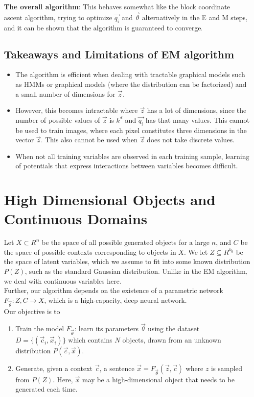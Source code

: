\documentclass[a4paper]{article}
\begin{document}
\textbf{The overall algorithm}: This behaves somewhat like the block coordinate ascent algorithm, trying to optimize $\vec{q_i}$ and $\vec{\theta}$ alternatively in the E and M steps, and it can be shown that the algorithm is guaranteed to converge.

\subsection{Takeaways and Limitations of EM algorithm} \begin{itemize}
    \item The algorithm is efficient when dealing with tractable graphical models such as HMMs or graphical models (where the distribution can be factorized) and a small number of dimensions for $\vec{z}$.

    \item However, this becomes intractable where $\vec{z}$ has a lot of dimensions, since the number of possible values of $\vec{z}$ is $k^d$ and $\vec{q_i}$ has that many values. This cannot be used to train images, where each pixel constitutes three dimensions in the vector $\vec{z}$. This also cannot be used when $\vec{z}$ does not take discrete values.

    \item When not all training variables are observed in each training sample, learning of potentials that express interactions between variables becomes difficult.
\end{itemize}

\section{High Dimensional Objects and Continuous Domains}

Let $X \subset R^{n}$ be the space of all possible generated objects for a large $n$, and $C$ be the space of possible contexts corresponding to objects in $X$. We let $Z \subseteq R^{k_0}$ be the space of latent variables, which we assume to fit into some known distribution $P(Z)$, such as the standard Gaussian distribution. Unlike in the EM algorithm, we deal with continuous variables here. \hfill \\

Further, our algorithm depends on the existence of a parametric network $F_{\vec{\theta}}: Z, C \rightarrow X $, which is a high-capacity, deep neural network. \hfill \\

Our objective is to \begin{enumerate}
    \item Train the model $F_{\vec{\theta}} $: learn its parameters $\vec{\theta}$ using the dataset $D = \{ ( \vec{c}_i, \vec{x}_i )\}$ which contains $N$ objects, drawn from an unknown distribution $P(\vec{c}, \vec{x})$.
    \item Generate, given a context $\vec{c}$, a sentence $\vec{x} = F_{\vec{\theta}} (\vec{z}, \vec{c})$ where $z$ is sampled from $P(Z)$. Here, $\vec{x}$ may be a high-dimensional object that needs to be generated each time.
\end{enumerate}
\end{document}
